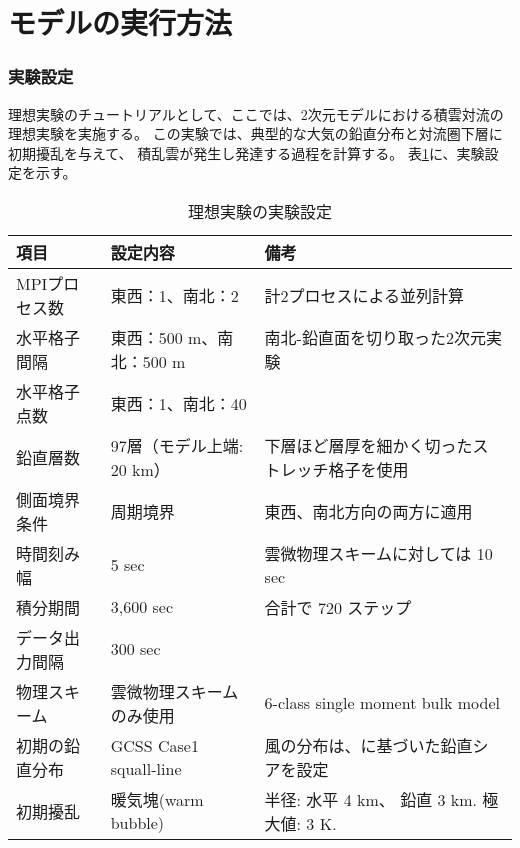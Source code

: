 \section{モデルの実行方法} \label{sec:ideal_exp_run}

\subsubsection{実験設定}

理想実験のチュートリアルとして、ここでは、2次元モデルにおける積雲対流の理想実験を実施する。
この実験では、典型的な大気の鉛直分布と対流圏下層に初期擾乱を与えて、
積乱雲が発生し発達する過程を計算する。
表\ref{tab:setting_ideal}に、実験設定を示す。

\begin{table}[htb]
\begin{minipage}{150mm}
\begin{center}
\caption{理想実験の実験設定}
\begin{tabularx}{150mm}{|l|X|X|} \hline
 \rowcolor[gray]{0.9} 項目 & 設定内容 & 備考 \\ \hline
 MPIプロセス数 & 東西：1、南北：2 & 計2プロセスによる並列計算 \\ \hline
 水平格子間隔 & 東西：500 m、南北：500 m & 南北-鉛直面を切り取った2次元実験 \\ \hline
 水平格子点数 & 東西：1、南北：40 &  \\ \hline
 鉛直層数     & 97層（モデル上端: 20 km）& 下層ほど層厚を細かく切ったストレッチ格子を使用 \\ \hline
 側面境界条件 & 周期境界 & 東西、南北方向の両方に適用 \\ \hline
 時間刻み幅   & 5 sec      & 雲微物理スキームに対しては 10 sec \\ \hline
 積分期間     & 3,600 sec  & 合計で 720 ステップ  \\ \hline
 データ出力間隔 & 300 sec  &  \\ \hline
 物理スキーム & 雲微物理スキームのみ使用 &
 6-class single moment bulk model \citep{tomita_2008} \\ \hline
 初期の鉛直分布 & GCSS Case1 squall-line \citep{Redelsperger2000}&
 風の分布は、\citet{Ooyama_2001}に基づいた鉛直シアを設定 \\ \hline
 初期擾乱 & 暖気塊(warm bubble) & 半径: 水平 4 km、
 鉛直 3 km. 極大値: 3 K. \\ \hline
\end{tabularx}
\label{tab:setting_ideal}
\end{center}
\end{minipage}
\end{table}


